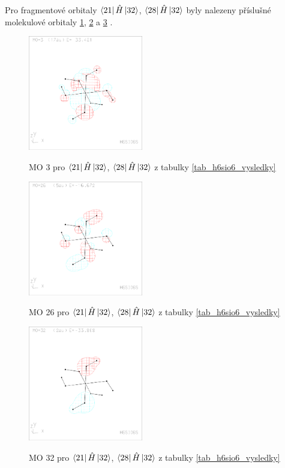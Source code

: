 \documentclass[
  digital, %
  table,   %
  lof,     %
  lot,     %
]{fithesis3}
\begin{document}
Pro fragmentové orbitaly $\bra{21}{\hat{H}}\ket{32}$, $\bra{28}{\hat{H}}\ket{32}$ byly nalezeny příslušné molekulové orbitaly \ref{obr_h6sio6_MO_s2_3}, \ref{obr_h6sio6_MO_s2_26} a \ref{obr_h6sio6_MO_s2_32} .
  
  \begin{figure}[h]
\caption{MO 3 pro $\bra{21}{\hat{H}}\ket{32}$, $\bra{28}{\hat{H}}\ket{32}$  z tabulky \ref{tab_h6sio6_vysledky}}
  \center
  \includegraphics[width=5cm]{h6sio6_obrazky/s2_3.eps}
  \label{obr_h6sio6_MO_s2_3}
  \end{figure}
 
 \begin{figure}[h]
\caption{MO 26 pro $\bra{21}{\hat{H}}\ket{32}$, $\bra{28}{\hat{H}}\ket{32}$ z tabulky \ref{tab_h6sio6_vysledky}}
  \center
  \includegraphics[width=5cm]{h6sio6_obrazky/s2_26.eps}
  \label{obr_h6sio6_MO_s2_26}
  \end{figure}

\begin{figure}[h]
\caption{MO 32 pro $\bra{21}{\hat{H}}\ket{32}$, $\bra{28}{\hat{H}}\ket{32}$  z tabulky \ref{tab_h6sio6_vysledky}}
  \center
  \includegraphics[width=5cm]{h6sio6_obrazky/s2_32.eps}
  \label{obr_h6sio6_MO_s2_32}
  \end{figure}
\end{document}

